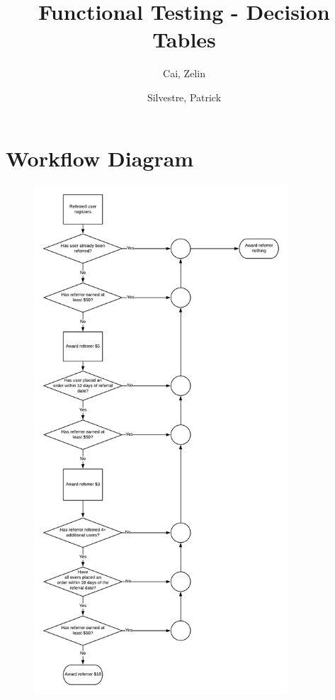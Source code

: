 \documentclass[10pt,letterpaper]{article}
\title{Functional Testing - Decision Tables}
\author{
	Cai, Zelin\\
	\and
	Silvestre, Patrick\\
}
\date{}
\begin{document}
\maketitle
\newpage
\section{Workflow Diagram}
\begin{figure}[h]
	\centerline{\includegraphics[width=9.5cm]{workflow.png}}
\end{figure}

\newpage
\end{document}

